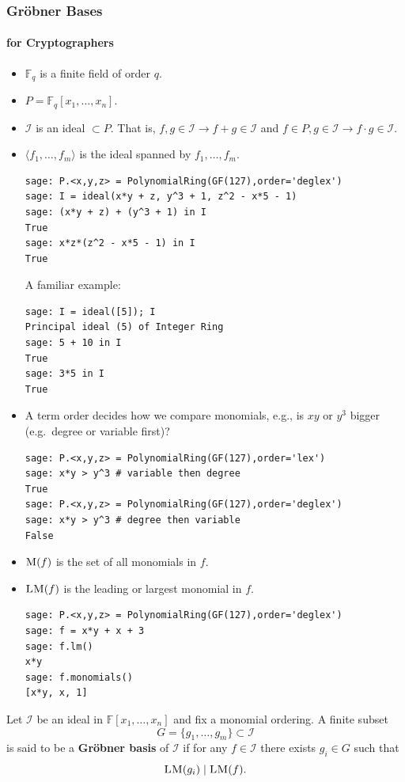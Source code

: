 \documentclass[9pt]{beamer}
\renewcommand{\emph}[1]{\textbf{\color{oxygenorange}#1}\xspace}
\newcommand{\field}[1]{\ensuremath{\mathbb{#1}}}
\newcommand{\M}[1]{\ensuremath{\textsc{M}(#1)\xspace}}
\newcommand{\LM}[1]{\ensuremath{\textsc{LM}(#1)\xspace}}
\newcommand{\ideal}[1]{\langle #1 \rangle}
\begin{document}
\begin{frame}
\frametitle{Gröbner Bases}
\framesubtitle{for Cryptographers} 

\begin{itemize}
 \item $\field{F}_q$ is a finite field of order $q$.
 \item $P = \field{F}_q[x_1,\dots,x_{n}]$.
 \item $\mathcal{I}$ is an ideal $ \subset P$. That is, $f,g \in \mathcal{I} \rightarrow f + g \in \mathcal{I}$ and $f \in P, g \in \mathcal{I} \rightarrow f \cdot g \in \mathcal{I}.$

  \item $\ideal{f_1,\dots,f_{m}}$ is the ideal spanned by $f_1,\dots,f_{m}$.
\begin{lstlisting}
sage: P.<x,y,z> = PolynomialRing(GF(127),order='deglex')
sage: I = ideal(x*y + z, y^3 + 1, z^2 - x*5 - 1)
sage: (x*y + z) + (y^3 + 1) in I
True
sage: x*z*(z^2 - x*5 - 1) in I
True
\end{lstlisting}

A familiar example:
\begin{lstlisting}
sage: I = ideal([5]); I
Principal ideal (5) of Integer Ring
sage: 5 + 10 in I
True
sage: 3*5 in I
True
\end{lstlisting}



\framebreak 
 \item A term order decides how we compare monomials, e.g., is $xy$ or $y^3$ bigger\\(e.g.\ degree or variable first)?
\begin{lstlisting}
sage: P.<x,y,z> = PolynomialRing(GF(127),order='lex')
sage: x*y > y^3 # variable then degree
True
sage: P.<x,y,z> = PolynomialRing(GF(127),order='deglex')
sage: x*y > y^3 # degree then variable
False
\end{lstlisting}
 \item $\M{f}$ is the set of all monomials in $f$.
 \item $\LM{f}$ is the leading or largest monomial in $f$.
\begin{lstlisting}
sage: P.<x,y,z> = PolynomialRing(GF(127),order='deglex')
sage: f = x*y + x + 3
sage: f.lm()
x*y
sage: f.monomials()
[x*y, x, 1]
\end{lstlisting}
\end{itemize}

\framebreak

\begin{definition}
Let $\mathcal{I}$ be an ideal in $\field{F}[x_1,\dots,x_{n}]$ and fix a monomial ordering. A finite subset $$G = \{g_1 ,\dots , g_{m} \} \subset \mathcal{I}$$  is said to be a \emph{Gr\"obner basis} of $\mathcal{I}$ if for any $f \in \mathcal{I}$ there exists $g_i \in G$ such that $$\LM{g_i} \mid \LM{f}.$$
\end{definition}


\end{frame}
\end{document}

